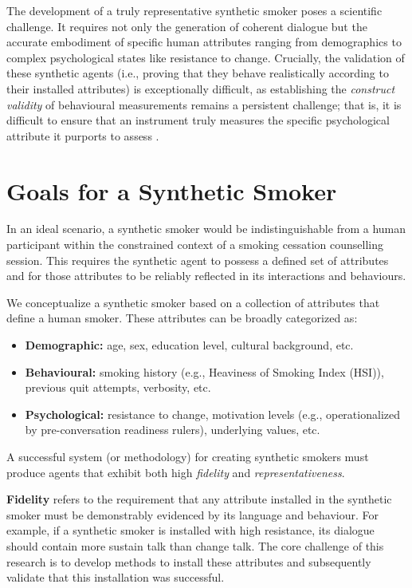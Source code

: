 The development of a truly representative synthetic smoker poses a scientific challenge. It requires not only the generation of coherent dialogue but the accurate embodiment of specific human attributes ranging from demographics to complex psychological states like resistance to change. Crucially, the validation of these synthetic agents (i.e., proving that they behave realistically according to their installed attributes) is exceptionally difficult, as establishing the \textit{construct validity} of behavioural measurements remains a persistent challenge; that is, it is difficult to ensure that an instrument truly measures the specific psychological attribute it purports to assess \cite{Cronbach1955}.


\section{Goals for a Synthetic Smoker}
\label{sec:synthetic-smoker-ideal}

In an ideal scenario, a synthetic smoker would be indistinguishable from a human participant within the constrained context of a smoking cessation counselling session. This requires the synthetic agent to possess a defined set of attributes and for those attributes to be reliably reflected in its interactions and behaviours.

We conceptualize a synthetic smoker based on a collection of attributes that define a human smoker. These attributes can be broadly categorized as:

\begin{itemize}
    \item \textbf{Demographic:} age, sex, education level, cultural background, etc.
    \item \textbf{Behavioural:} smoking history (e.g., Heaviness of Smoking Index (HSI)), previous quit attempts, verbosity, etc.
    \item \textbf{Psychological:} resistance to change, motivation levels (e.g., operationalized by pre-conversation readiness rulers), underlying values, etc.
\end{itemize}

A successful system (or methodology) for creating synthetic smokers must produce agents that exhibit both high \emph{fidelity} and \emph{representativeness}.

\textbf{Fidelity} refers to the requirement that any attribute installed in the synthetic smoker must be demonstrably evidenced by its language and behaviour. For example, if a synthetic smoker is installed with high resistance, its dialogue should contain more sustain talk than change talk. The core challenge of this research is to develop methods to install these attributes and subsequently validate that this installation was successful.

